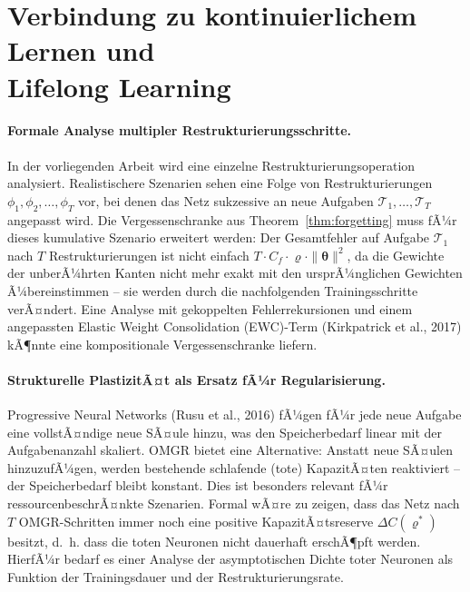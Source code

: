 ﻿\documentclass[12pt, a4paper, openany]{report}
\begin{document}
\section{Verbindung zu kontinuierlichem Lernen und \\ Lifelong Learning}
\label{sec:outlook_continual}

\paragraph{Formale Analyse multipler Restrukturierungsschritte.}
In der vorliegenden Arbeit wird eine einzelne Restrukturierungsoperation
analysiert.  Realistischere Szenarien sehen eine Folge von
Restrukturierungen $\phi_1, \phi_2, \ldots, \phi_T$ vor, bei denen
das Netz sukzessive an neue Aufgaben $\mathcal{T}_1, \ldots, \mathcal{T}_T$
angepasst wird.  Die Vergessenschranke aus Theorem~\ref{thm:forgetting}
muss fÃ¼r dieses kumulative Szenario erweitert werden: Der Gesamtfehler
auf Aufgabe $\mathcal{T}_1$ nach $T$ Restrukturierungen ist nicht
einfach $T \cdot C_f \cdot \varrho \cdot \|\bm{\theta}\|^2$, da die
Gewichte der unberÃ¼hrten Kanten nicht mehr exakt mit den ursprÃ¼nglichen
Gewichten Ã¼bereinstimmen -- sie werden durch die nachfolgenden
Trainingsschritte verÃ¤ndert.  Eine Analyse mit gekoppelten
Fehlerrekursionen und einem angepassten Elastic Weight Consolidation
(EWC)-Term (Kirkpatrick et al., 2017) kÃ¶nnte eine kompositionale
Vergessenschranke liefern.

\paragraph{Strukturelle PlastizitÃ¤t als Ersatz fÃ¼r Regularisierung.}
Progressive Neural Networks (Rusu et al., 2016) fÃ¼gen fÃ¼r jede neue
Aufgabe eine vollstÃ¤ndige neue SÃ¤ule hinzu, was den Speicherbedarf
linear mit der Aufgabenanzahl skaliert.  OMGR bietet eine Alternative:
Anstatt neue SÃ¤ulen hinzuzufÃ¼gen, werden bestehende schlafende
(tote) KapazitÃ¤ten reaktiviert -- der Speicherbedarf bleibt konstant.
Dies ist besonders relevant fÃ¼r ressourcenbeschrÃ¤nkte Szenarien.
Formal wÃ¤re zu zeigen, dass das Netz nach $T$ OMGR-Schritten immer noch
eine positive KapazitÃ¤tsreserve $\Delta C(\varrho^*)$ besitzt, d.~h.
dass die toten Neuronen nicht dauerhaft erschÃ¶pft werden.  HierfÃ¼r
bedarf es einer Analyse der asymptotischen Dichte toter Neuronen als
Funktion der Trainingsdauer und der Restrukturierungsrate.
\end{document}
